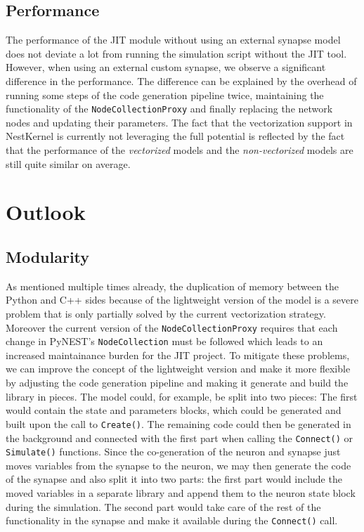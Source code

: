 \subsection*{Performance}

The performance of the JIT module without using an external synapse model does not deviate a lot from running the simulation script without the JIT tool. However, when using an external custom synapse, we observe a significant difference in the performance. The difference can be explained by the overhead of running some steps of the code generation pipeline twice, maintaining the functionality of the \texttt{NodeCollectionProxy} and finally replacing the network nodes and updating their parameters. The fact that the vectorization support in NestKernel is currently not leveraging the full potential is reflected by the fact that the performance of the \emph{vectorized} models and the \emph{non-vectorized} models are still quite similar on average.

\section{Outlook}

\subsection*{Modularity}

As mentioned multiple times already, the duplication of memory between the Python and C++ sides because of the lightweight version of the model is a severe problem that is only partially solved by the current vectorization strategy. Moreover the current version of the \texttt{NodeCollectionProxy} requires that each change in PyNEST's \texttt{NodeCollection} must be followed which leads to an increased maintainance burden for the JIT project. To mitigate these problems, we can improve the concept of the lightweight version and make it more flexible by adjusting the code generation pipeline and making it generate and build the library in pieces. The model could, for example, be split into two pieces: The first would contain the state and parameters blocks, which could be generated and built upon the call to \texttt{Create()}. The remaining code could then be generated in the background and connected with the first part when calling the \texttt{Connect()} or \texttt{Simulate()} functions. Since the co-generation of the neuron and synapse just moves variables from the synapse to the neuron, we may then generate the code of the synapse and also split it into two parts: the first part would include the moved variables in a separate library and append them to the neuron state block during the simulation. The second part would take care of the rest of the functionality in the synapse and make it available during the \texttt{Connect()} call.

